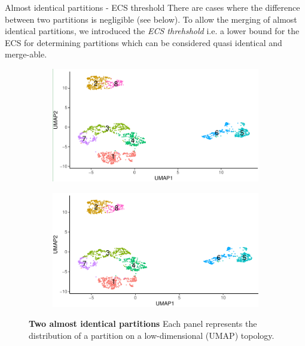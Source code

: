 \begin{frame}{Almost identical partitions - ECS threshold}
    There are cases where the difference between two partitions is negligible (see below).
    To allow the merging of almost identical partitions, we introduced the \textit{ECS threhshold} i.e.  a lower bound for the ECS for determining partitions which can be considered quasi identical and merge-able.
    \begin{figure}
        \centering
        \begin{subfigure}[t]{0.47\textwidth}
            \includegraphics[width=\textwidth]{images/ch2/2_almost_s.png}
        \end{subfigure}
        \begin{subfigure}[b]{0.47\textwidth}
            \includegraphics[width=\textwidth]{images/ch2/2_almost_m.png}
        \end{subfigure}
        \caption{\textbf{Two almost identical partitions} Each panel represents the distribution of a partition on a low-dimensional (UMAP) topology.}
    \end{figure}
\end{frame}

